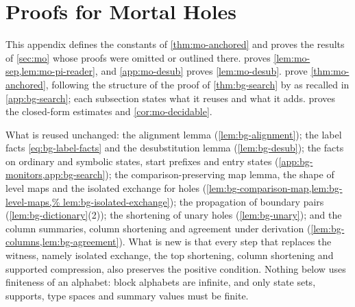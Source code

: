 
\section{Proofs for Mortal Holes}\label{app:mo}

This appendix defines the constants of \cref{thm:mo-anchored} and proves the
results of \cref{sec:mo} whose proofs were omitted or outlined there.
 proves \cref{lem:mo-sep,lem:mo-pi-reader}, and
\cref{app:mo-desub} proves
\cref{lem:mo-desub}.  prove \cref{thm:mo-anchored},
following the structure of the proof of \cref{thm:bg-search} by \citet{Zhao26} as
recalled in \cref{app:bg-search}; each subsection states what it reuses and
what it adds.  proves the closed-form estimates and
\cref{cor:mo-decidable}.

What is reused unchanged: the alignment lemma (\cref{lem:bg-alignment}); the
label facts \cref{eq:bg-label-facts} and the desubstitution lemma
(\cref{lem:bg-desub}); the facts on ordinary and symbolic states, start
prefixes and entry states (\cref{app:bg-monitors,app:bg-search}); the
comparison-preserving map lemma, the shape of level maps and the isolated
exchange for holes (\cref{lem:bg-comparison-map,lem:bg-level-maps,%
lem:bg-isolated-exchange}); the propagation of boundary pairs
(\cref{lem:bg-dictionary}(2)); the shortening of unary holes
(\cref{lem:bg-unary}); and the column summaries, column
shortening and agreement under derivation
(\cref{lem:bg-columns,lem:bg-agreement}). What is new is that every step that
replaces the witness, namely isolated exchange, the top shortening, column
shortening and supported compression, also preserves the positive condition.
Nothing below uses finiteness of an alphabet: block alphabets are infinite,
and only state sets, supports, type spaces and summary values must be finite.

